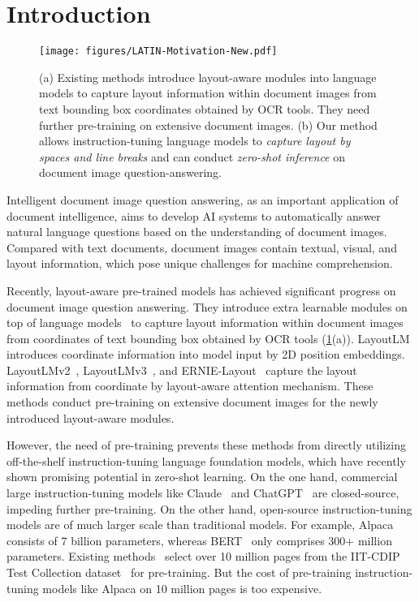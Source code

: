 \documentclass[letterpaper]{article} \usepackage{aaai24_preprint}  \usepackage{times}  \usepackage{helvet}  \usepackage{courier}  \usepackage[hyphens]{url}  \usepackage{graphicx} \urlstyle{rm} \def\UrlFont{\rm}  \usepackage{natbib}  \usepackage{caption} \frenchspacing  \setlength{\pdfpagewidth}{8.5in} \setlength{\pdfpageheight}{11in} \usepackage{algorithm}
\begin{document}
\section{Introduction}
\begin{figure}
\centering
\small
\texttt{[image: figures/LATIN-Motivation-New.pdf]}
\caption{
(a) Existing methods introduce layout-aware modules into language models to capture layout information within document images from text bounding box coordinates obtained by OCR tools.
They need further pre-training on extensive document images.
(b) Our method allows instruction-tuning language models to \emph{capture layout by spaces and line breaks} and can conduct \emph{zero-shot inference} on document image question-answering.
}
\label{fig:motivation}
\end{figure}
Intelligent document image question answering, as an important application of document intelligence, aims to develop AI systems to automatically answer natural language questions based on the understanding of document images.
Compared with text documents, document images contain textual, visual, and layout information, which pose unique challenges for machine comprehension.

Recently, layout-aware pre-trained models has achieved significant progress on document image question answering.
They introduce extra learnable modules on top of language models~\cite{devlinBERTPretrainingDeep2019,liuRoBERTa2019,raffelT52020,baoUniLMv22020} to capture layout information within document images from coordinates of text bounding box obtained by OCR tools (\cref{fig:motivation}(a)).
LayoutLM~\cite{xuLayoutLM2020} introduces coordinate information into model input by 2D position embeddings. LayoutLMv2~\cite{xuLayoutLMv22021}, LayoutLMv3~\cite{huangLayoutLMv32022}, and ERNIE-Layout~\cite{pengERNIELayout2022} capture the layout information from coordinate by layout-aware attention mechanism.
These methods conduct pre-training on extensive document images for the newly introduced layout-aware modules.

However, the need of pre-training prevents these methods from directly utilizing off-the-shelf instruction-tuning language foundation models, which have recently shown promising potential in zero-shot learning.
On the one hand, commercial large instruction-tuning models like Claude~\cite{Claude} and ChatGPT~\cite{ChatGPT} are closed-source, impeding further pre-training.
On the other hand, open-source instruction-tuning models are of much larger scale than traditional models.
For example, Alpaca~\cite{StanfordAlpacaInstructionfollowing2023} consists of 7 billion parameters, whereas BERT~\cite{devlinBERTPretrainingDeep2019} only comprises 300+ million parameters.
Existing methods~\cite{xuLayoutLM2020,xuLayoutLMv22021,huangLayoutLMv32022,pengERNIELayout2022} select over 10 million pages from the IIT-CDIP Test Collection dataset~\cite{lewisIIT-CDIP2006} for pre-training. But the cost of pre-training instruction-tuning models like Alpaca on 10 million pages is too expensive.
\end{document}
